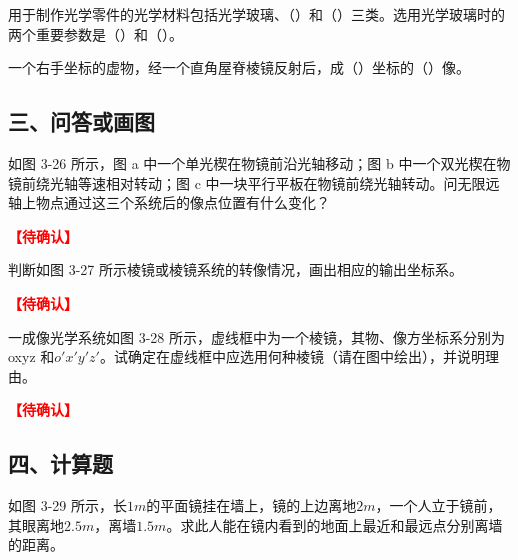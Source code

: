 \documentclass[padl, analysis, notocnum]{ExBook}
\newcommand{\answerarea}[1][3.5cm]{%
  \par\vspace{1mm}%
  \noindent{\color{themeColor!35}\rule{\linewidth}{0.4pt}}\par
  \noindent\begin{minipage}[t][#1][t]{\linewidth}\vspace{0pt}\end{minipage}\par
  \noindent{\color{themeColor!35}\rule{\linewidth}{0.4pt}}\par
}
\newcommand{\tbd}{\textcolor{red}{\textbf{【待确认】}}}
\begin{document}
\begin{qitems}[startnum=4]
\qitem 用于制作光学零件的光学材料包括光学玻璃、（\hspace{1.6em}）和（\hspace{1.6em}）三类。选用光学玻璃时的两个重要参数是（\hspace{1.6em}）和（\hspace{1.6em}）。
\label{q:58:start}
\answerarea[4.0cm]
\label{q:58:end}
\end{qitems}

\begin{qitems}[startnum=5]
\qitem 一个右手坐标的虚物，经一个直角屋脊棱镜反射后，成（\hspace{1.6em}）坐标的（\hspace{1.6em}）像。
\label{q:59:start}
\answerarea[4.0cm]
\label{q:59:end}
\end{qitems}

\subsection{三、问答或画图}
\begin{qitems}[startnum=1,suffix={*}]
\qitem[][.] 如图 3-26 所示，图 a 中一个单光楔在物镜前沿光轴移动；图 b 中一个双光楔在物镜前绕光轴等速相对转动；图 c 中一块平行平板在物镜前绕光轴转动。问无限远轴上物点通过这三个系统后的像点位置有什么变化？
\par\noindent\tbd
{}
\label{q:60:start}
\answerarea[2.4cm]
\label{q:60:end}
\end{qitems}

\begin{qitems}[startnum=2]
\qitem 判断如图 3-27 所示棱镜或棱镜系统的转像情况，画出相应的输出坐标系。
\par\noindent\tbd
{}
\label{q:61:start}
\answerarea[2.4cm]
\label{q:61:end}
\end{qitems}

\begin{qitems}[startnum=3,suffix={*}]
\qitem[][.] 一成像光学系统如图 3-28 所示，虚线框中为一个棱镜，其物、像方坐标系分别为 oxyz 和$o'x'y'z'$。试确定在虚线框中应选用何种棱镜（请在图中绘出），并说明理由。
\par\noindent\tbd
{}
\label{q:62:start}
\answerarea[2.4cm]
\label{q:62:end}
\end{qitems}

\subsection{四、计算题}
\begin{qitems}[startnum=1]
\qitem 如图 3-29 所示，长$1m$的平面镜挂在墙上，镜的上边离地$2m$，一个人立于镜前，其眼离地$2.5m$，离墙$1.5m$。求此人能在镜内看到的地面上最近和最远点分别离墙的距离。
\label{q:63:start}
\answerarea[2.4cm]
\label{q:63:end}
\end{qitems}
\end{document}
